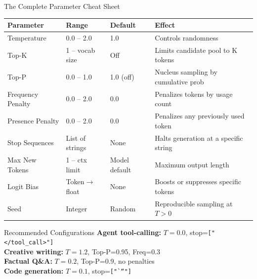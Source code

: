 \documentclass{beamer}
\begin{document}
\begin{frame}{The Complete Parameter Cheat Sheet}
    \centering
    \tiny
    \begin{tabular}{@{}llll@{}}
        \toprule
        \textbf{Parameter}     & \textbf{Range}    & \textbf{Default} & \textbf{Effect} \\ \midrule
        Temperature            & 0.0 -- 2.0        & 1.0              & Controls randomness \\
        Top-K                  & 1 -- vocab size   & Off              & Limits candidate pool to K tokens \\
        Top-P                  & 0.0 -- 1.0        & 1.0 (off)        & Nucleus sampling by cumulative prob \\
        Frequency Penalty      & 0.0 -- 2.0        & 0.0              & Penalizes tokens by usage count \\
        Presence Penalty       & 0.0 -- 2.0        & 0.0              & Penalizes any previously used token \\
        Stop Sequences         & List of strings   & None             & Halts generation at a specific string \\
        Max New Tokens         & 1 -- ctx limit    & Model default    & Maximum output length \\
        Logit Bias             & Token$\to$float   & None             & Boosts or suppresses specific tokens \\
        Seed                   & Integer           & Random           & Reproducible sampling at $T>0$ \\ \bottomrule
    \end{tabular}

    \vspace{0.3cm}
    \normalsize
    \begin{block}{Recommended Configurations}
        \textbf{Agent tool-calling:} $T=0.0$, stop=\texttt{["\textless/tool\_call\textgreater"]} \\
        \textbf{Creative writing:} $T=1.2$, Top-P=0.95, Freq=0.3 \\
        \textbf{Factual Q\&A:} $T=0.2$, Top-P=0.9, no penalties \\
        \textbf{Code generation:} $T=0.1$, stop=\texttt{["```"]}
    \end{block}
\end{frame}
\end{document}
